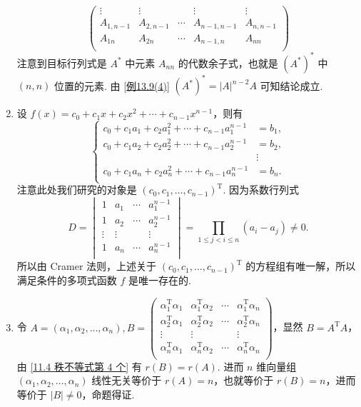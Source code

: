 \begin{enumerate}
\[\begin{pmatrix}
        \vdots & \vdots &        & \vdots     & \vdots \\
        A_{1, n-1} & A_{2, n-1} & \cdots & A_{n-1, n-1} & A_{n, n-1} \\
        A_{1n} & A_{2n} & \cdots & A_{n-1, n} & A_{nn} \\
    \end{pmatrix}\]
    注意到目标行列式是 $A^*$ 中元素 $A_{nn}$ 的代数余子式，也就是 $(A^*)^*$ 中 $(n, n)$ 位置的元素. 由 \ref*{例13.9(4)} $(A^*)^* = \lvert A \rvert^{n-2}A$ 可知结论成立.
    \item 设 $f(x) = c_0+c_1x+c_2x^2+\cdots+c_{n-1}x^{n-1}$，则有 \[\begin{cases}
        c_0+c_1a_1+c_2a_1^2+\cdots+c_{n-1}a_1^{n-1} & = b_1, \\
        c_0+c_1a_2+c_2a_2^2+\cdots+c_{n-1}a_2^{n-1} & = b_2, \\
                                                    & \vdots  \\ %
        c_0+c_1a_n+c_2a_n^2+\cdots+c_{n-1}a_n^{n-1} & = b_n. \\
    \end{cases}\] 注意此处我们研究的对象是 $(c_0, c_1, \ldots, c_{n-1})^{\mathrm{T}}$. 因为系数行列式 \[D = \begin{vmatrix}
        1 & a_1 & \cdots & a_1^{n-1} \\
        1 & a_2 & \cdots & a_2^{n-1} \\
        \vdots & \vdots & & \vdots \\
        1 & a_n & \cdots & a_n^{n-1} \\
    \end{vmatrix} = \prod_{1 \leqslant j < i \leqslant n} (a_i-a_j) \neq 0.\] 所以由 Cramer 法则，上述关于 $(c_0, c_1, \ldots, c_{n-1})^{\mathrm{T}}$ 的方程组有唯一解，所以满足条件的多项式函数 $f$ 是唯一存在的.
    \item 令 $A = (\alpha_1, \alpha_2, \ldots, \alpha_n), B = \begin{pmatrix}
        \alpha_1^{\mathrm{T}}\alpha_1 & \alpha_1^{\mathrm{T}}\alpha_2 & \cdots & \alpha_1^{\mathrm{T}}\alpha_n \\
        \alpha_2^{\mathrm{T}}\alpha_1 & \alpha_2^{\mathrm{T}}\alpha_2 & \cdots & \alpha_2^{\mathrm{T}}\alpha_n \\
        \vdots & \vdots & & \vdots \\
        \alpha_n^{\mathrm{T}}\alpha_1 & \alpha_n^{\mathrm{T}}\alpha_2 & \cdots & \alpha_n^{\mathrm{T}}\alpha_n \\
    \end{pmatrix}$，显然 $B = A^{\mathrm{T}}A$，由 \ref*{11.4 秩不等式第 4 个} 有 $r(B) = r(A)$. 进而 $n$ 维向量组 $(\alpha_1, \alpha_2, \ldots, \alpha_n)$ 线性无关等价于 $r(A) = n$，也就等价于 $r(B) = n$，进而等价于 $\lvert B \rvert \neq 0$，命题得证.

\end{enumerate}
